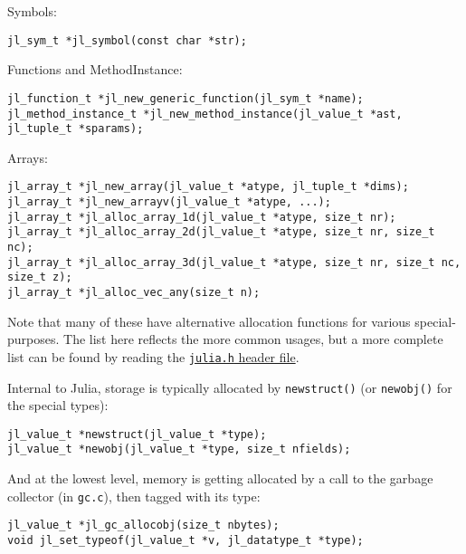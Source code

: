 Symbols:




\begin{lstlisting}
jl_sym_t *jl_symbol(const char *str);
\end{lstlisting}



Functions and MethodInstance:




\begin{lstlisting}
jl_function_t *jl_new_generic_function(jl_sym_t *name);
jl_method_instance_t *jl_new_method_instance(jl_value_t *ast, jl_tuple_t *sparams);
\end{lstlisting}



Arrays:




\begin{lstlisting}
jl_array_t *jl_new_array(jl_value_t *atype, jl_tuple_t *dims);
jl_array_t *jl_new_arrayv(jl_value_t *atype, ...);
jl_array_t *jl_alloc_array_1d(jl_value_t *atype, size_t nr);
jl_array_t *jl_alloc_array_2d(jl_value_t *atype, size_t nr, size_t nc);
jl_array_t *jl_alloc_array_3d(jl_value_t *atype, size_t nr, size_t nc, size_t z);
jl_array_t *jl_alloc_vec_any(size_t n);
\end{lstlisting}



Note that many of these have alternative allocation functions for various special-purposes. The list here reflects the more common usages, but a more complete list can be found by reading the \href{https://github.com/JuliaLang/julia/blob/master/src/julia.h}{\texttt{julia.h} header file}.



Internal to Julia, storage is typically allocated by \texttt{newstruct()} (or \texttt{newobj()} for the special types):




\begin{lstlisting}
jl_value_t *newstruct(jl_value_t *type);
jl_value_t *newobj(jl_value_t *type, size_t nfields);
\end{lstlisting}



And at the lowest level, memory is getting allocated by a call to the garbage collector (in \texttt{gc.c}), then tagged with its type:




\begin{lstlisting}
jl_value_t *jl_gc_allocobj(size_t nbytes);
void jl_set_typeof(jl_value_t *v, jl_datatype_t *type);
\end{lstlisting}



